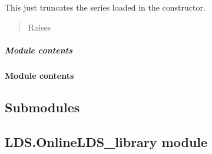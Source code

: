 \documentclass[letterpaper,10pt,english]{sphinxmanual}
\begin{document}
\begin{fulllineitems}
\begin{fulllineitems}
\label{\detokenize{LDS.LDS.ts:LDS.LDS.ts.time_series.TimeSeries.solve}}
\sphinxAtStartPar
This just truncates the series loaded in the constructor.
\begin{quote}\begin{description}
\item[{Raises}] \leavevmode
\sphinxAtStartPar
{} \textendash{} 

\end{description}\end{quote}

\end{fulllineitems}


\end{fulllineitems}



\subparagraph{Module contents}
\label{\detokenize{LDS.LDS.ts:module-LDS.LDS.ts}}\label{\detokenize{LDS.LDS.ts:module-contents}}

\paragraph{Module contents}
\label{\detokenize{LDS.LDS:module-LDS.LDS}}\label{\detokenize{LDS.LDS:module-contents}}

\subsection{Submodules}
\label{\detokenize{LDS:submodules}}

\subsection{LDS.OnlineLDS\_library module}
\label{\detokenize{LDS:module-LDS.OnlineLDS_library}}\label{\detokenize{LDS:lds-onlinelds-library-module}}
\end{document}
